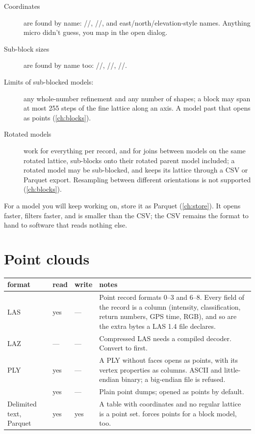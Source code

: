 \begin{description}
\item[Coordinates] are found by name: //, //, and
  east/north/elevation-style names. Anything micro didn't guess, you map in the open dialog.
\item[Sub-block sizes] are found by name too: \slash{}\slash{},
  \slash{}\slash{}, \slash{}\slash{}.
\item[Limits of sub-blocked models:] any whole-number refinement and any number of shapes; a
  block may span at most 255 steps of the fine lattice along an axis. A model past that opens as
  points (\cref{ch:blocks}).
\item[Rotated models] work for everything per record, and for joins between models on the same
  rotated lattice, sub-blocks onto their rotated parent model included; a rotated model may be
  sub-blocked, and keeps its lattice through a CSV or Parquet export. Resampling between different
  orientations is not supported (\cref{ch:blocks}).
\end{description}

\begin{tip}
For a model you will keep working on, store it as Parquet (\cref{ch:store}). It opens faster, filters
faster, and is smaller than the CSV; the CSV remains the format to hand to software that reads
nothing else.
\end{tip}

\section{Point clouds}\label{sec:formats-points}

\begin{tabularx}{\linewidth}{@{}p{27mm}p{9mm}p{9mm}L@{}}
\toprule
format & read & write & notes \\
\midrule
LAS  & yes & — & Point record formats 0–3 and 6–8. Every field of the record is a
  column (intensity, classification, return numbers, GPS time, RGB), and so are the extra bytes a
  LAS 1.4 file declares. \\
LAZ  & — & — & Compressed LAS needs a compiled decoder. Convert to  first. \\
PLY  & yes & — & A PLY without faces opens as points, with its vertex properties as
  columns. ASCII and little-endian binary; a big-endian file is refused. \\
  & yes & — & Plain point dumps; opened as points by default. \\
Delimited text, Parquet & yes & yes & A table with coordinates and no regular lattice is a point
  set.  forces points for a block model, too. \\
\bottomrule
\end{tabularx}

